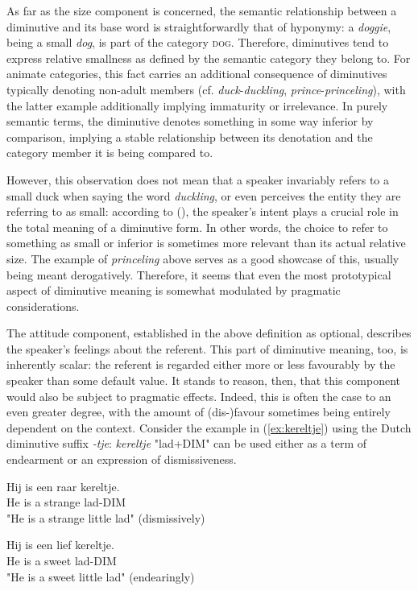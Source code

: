 As far as the size component is concerned, the semantic relationship between a diminutive and its base word is straightforwardly that of hyponymy: a \textit{doggie}, being a small \textit{dog}, is part of the category \textsc{dog}. Therefore, diminutives tend to express relative smallness as defined by the semantic category they belong to. For animate categories, this fact carries an additional consequence of diminutives typically denoting non-adult members (cf. \textit{duck}-\textit{duckling}, \textit{prince}-\textit{princeling}), with the latter example additionally implying immaturity or irrelevance. In purely semantic terms, the diminutive denotes something in some way inferior by comparison, implying a stable relationship between its denotation and the category member it is being compared to.

However, this observation does not mean that a speaker invariably refers to a small duck when saying the word \textit{duckling}, or even perceives the entity they are referring to as small: according to \citeauthor{Schneider+2003} (\citeyear{Schneider+2003}), the speaker's intent plays a crucial role in the total meaning of a diminutive form. In other words, the choice to refer to something as small or inferior is sometimes more relevant than its actual relative size. The example of \textit{princeling} above serves as a good showcase of this, usually being meant derogatively. Therefore, it seems that even the most prototypical aspect of diminutive meaning is somewhat modulated by pragmatic considerations.

The attitude component, established in the above definition as optional, describes the speaker's feelings about the referent. This part of diminutive meaning, too, is inherently scalar: the referent is regarded either more or less favourably by the speaker than some default value. It stands to reason, then, that this component would also be subject to pragmatic effects. Indeed, this is often the case to an even greater degree, with the amount of (dis-)favour sometimes being entirely dependent on the context. Consider the example in (\ref{ex:kereltje}) using the Dutch diminutive suffix \textit{-tje}: \textit{kereltje} "lad+DIM" can be used either as a term of endearment or an expression of dismissiveness.

\begin{exe}
\ex \label{ex:kereltje} 
\begin{xlist}
\ex \gll
Hij is een raar kereltje.\\
He	is	a  strange	lad-DIM\\
\trans "He is a strange little lad" (dismissively)

\ex \gll
Hij is een lief kereltje.\\
He	is	a  sweet	lad-DIM\\
\trans "He is a sweet little lad" (endearingly)
\end{xlist}
\end{exe}

